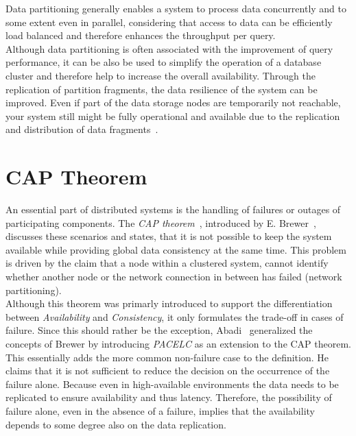 Data partitioning generally enables a system to process data concurrently and 
to some extent even in parallel, considering that access to data can be 
efficiently load balanced and therefore enhances the throughput per query.\\

Although data partitioning is often associated with the improvement of query performance,
it can be also be used to simplify the operation of a database cluster and therefore help 
to increase the overall availability.
Through the replication of partition fragments, the data resilience of the system
can be improved. Even if part of the data storage nodes are temporarily not 
reachable, your system still might be fully operational and available due to the 
replication and distribution of data fragments~\cite{dbre2017}.







\section{CAP Theorem}
\label{sec:cap}
An essential part of distributed systems is the handling of failures or outages of participating components. 
The \emph{CAP theorem}~\cite{cap2002}, introduced by E. Brewer~\cite{brewer:2000}, discusses these scenarios and states, that it is not possible 
to keep the system available while providing global data consistency at the same time.
This problem is driven by the claim that a node within a clustered system, cannot identify whether another node or the 
network connection in between has failed (network partitioning).\\
Although this theorem was primarly introduced to support the differentiation between \emph{Availability} and \emph{Consistency}, 
it only formulates the trade-off in cases of failure.
Since this should rather be the exception, Abadi~\cite{abadi2012} generalized the concepts of Brewer by introducing \emph{PACELC} as an extension to the CAP theorem.
This essentially adds the more common non-failure case to the definition.
He claims that it is not sufficient to reduce the decision on the occurrence of the failure alone. 
Because even in high-available environments the data needs to be replicated to ensure availability and thus latency. 
Therefore, the possibility of failure alone, even in the absence of a failure, implies that the availability depends to some degree also on the data replication.



